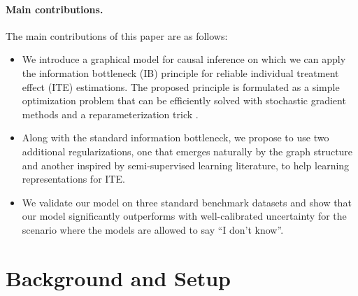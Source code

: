 \documentclass{article}
\begin{document}
\paragraph{Main contributions.} The main contributions of this paper are as follows:
\begin{itemize}
    \item We introduce a graphical model for causal inference on which we can apply the information bottleneck (IB) principle for reliable individual treatment effect (ITE) estimations. The proposed principle is formulated as a simple optimization problem that can be efficiently solved with stochastic gradient methods \cite{Kingma2015} and a reparameterization trick \cite{Kingma2014}.
    \item Along with the standard information bottleneck, we propose to use two additional regularizations, one that emerges naturally by the graph structure and another inspired by semi-supervised learning literature, to help learning representations for ITE.
    \item We validate our model on three standard benchmark datasets and show that our model significantly outperforms with well-calibrated uncertainty for the scenario where the models are allowed to say ``I don't know''.
\end{itemize}
    



\section{Background and Setup}
\end{document}
